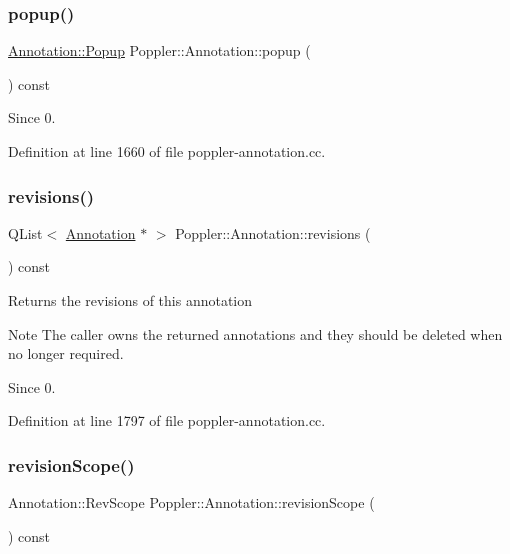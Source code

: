 \subsubsection{\texorpdfstring{popup()}{popup()}}
{\footnotesize\ttfamily \hyperlink{class_poppler_1_1_annotation_1_1_popup}{Annotation\+::\+Popup} Poppler\+::\+Annotation\+::popup (\begin{DoxyParamCaption}{ }\end{DoxyParamCaption}) const}

\begin{DoxySince}{Since}
0. 
\end{DoxySince}


Definition at line 1660 of file poppler-\/annotation.\+cc.

\mbox{\label{class_poppler_1_1_annotation_a9d0a905f8eea751f5b33e38245383ecb}} 
\subsubsection{\texorpdfstring{revisions()}{revisions()}}
{\footnotesize\ttfamily Q\+List$<$ \hyperlink{class_poppler_1_1_annotation}{Annotation} $\ast$ $>$ Poppler\+::\+Annotation\+::revisions (\begin{DoxyParamCaption}{ }\end{DoxyParamCaption}) const}

Returns the revisions of this annotation

\begin{DoxyNote}{Note}
The caller owns the returned annotations and they should be deleted when no longer required.
\end{DoxyNote}
\begin{DoxySince}{Since}
0. 
\end{DoxySince}


Definition at line 1797 of file poppler-\/annotation.\+cc.

\mbox{\label{class_poppler_1_1_annotation_ad9fb16c5e50ac91e51f4ea3547eea2ad}} 
\subsubsection{\texorpdfstring{revision\+Scope()}{revisionScope()}}
{\footnotesize\ttfamily Annotation\+::\+Rev\+Scope Poppler\+::\+Annotation\+::revision\+Scope (\begin{DoxyParamCaption}{ }\end{DoxyParamCaption}) const}

